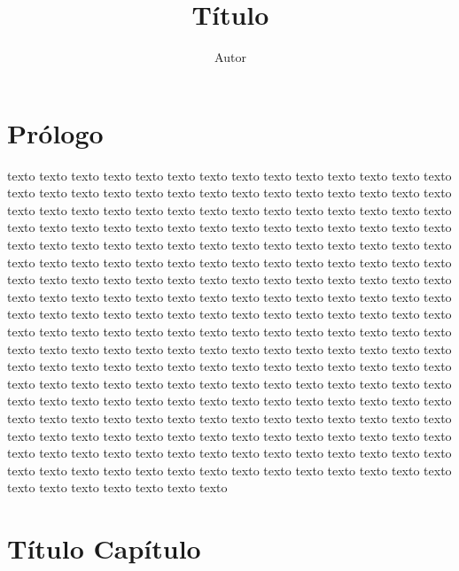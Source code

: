 \documentclass[11pt,twoside,openright,a5paper]{book}
\title{Título}
\author{Autor}
\date{}
\begin{document}
\pagestyle{plain}

\maketitle

\tableofcontents

\chapter*{Prólogo}

texto texto texto texto texto texto texto texto 
texto texto texto texto texto texto texto texto
texto texto texto texto texto texto texto texto
texto texto texto texto texto texto texto texto 
texto texto texto texto texto texto texto texto
texto texto texto texto texto texto texto texto
texto texto texto texto texto texto texto texto 
texto texto texto texto texto texto texto texto
texto texto texto texto texto texto texto texto
texto texto texto texto texto texto texto texto 
texto texto texto texto texto texto texto texto
texto texto texto texto texto texto texto texto
texto texto texto texto texto texto texto texto 
texto texto texto texto texto texto texto texto
texto texto texto texto texto texto texto texto
texto texto texto texto texto texto texto texto 
texto texto texto texto texto texto texto texto
texto texto texto texto texto texto texto texto
texto texto texto texto texto texto texto texto 
texto texto texto texto texto texto texto texto
texto texto texto texto texto texto texto texto
texto texto texto texto texto texto texto texto 
texto texto texto texto texto texto texto texto
texto texto texto texto texto texto texto texto
texto texto texto texto texto texto texto texto 
texto texto texto texto texto texto texto texto
texto texto texto texto texto texto texto texto
texto texto texto texto texto texto texto texto 
texto texto texto texto texto texto texto texto
texto texto texto texto texto texto texto texto
texto texto texto texto texto texto texto texto 
texto texto texto texto texto texto texto texto
texto texto texto 

\chapter{Título Capítulo}

\end{document}
